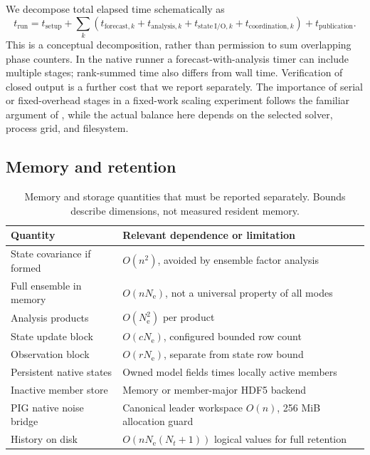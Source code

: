 \documentclass[11pt,a4paper]{article}
\newcommand{\Ne}{N_{\mathrm e}}
\begin{document}
We decompose total elapsed time schematically as
\begin{equation}
 t_{\mathrm{run}}=t_{\mathrm{setup}}+\sum_k
 \left(t_{\mathrm{forecast},k}+t_{\mathrm{analysis},k}
 +t_{\mathrm{state\ I/O},k}+t_{\mathrm{coordination},k}\right)
 +t_{\mathrm{publication}}.
 \label{eq:cost}
\end{equation}
This is a conceptual decomposition, rather than permission to sum overlapping phase counters. In the native runner a forecast-with-analysis timer can include multiple stages; rank-summed time also differs from wall time. Verification of closed output is a further cost that we report separately. The importance of serial or fixed-overhead stages in a fixed-work scaling experiment follows the familiar argument of \citet{amdahl1967}, while the actual balance here depends on the selected solver, process grid, and filesystem.

\subsection{Memory and retention}
\begin{table}[htbp]\centering\small
\caption{Memory and storage quantities that must be reported separately. Bounds describe dimensions, not measured resident memory.}\label{tab:memory}
\begin{tabular}{p{.35\linewidth}p{.54\linewidth}}\toprule
Quantity & Relevant dependence or limitation\\\midrule
State covariance if formed & \(O(n^2)\), avoided by ensemble factor analysis\\
Full ensemble in memory & \(O(n\Ne)\), not a universal property of all modes\\
Analysis products & \(O(\Ne^2)\) per product\\
State update block & \(O(c\Ne)\), configured bounded row count\\
Observation block & \(O(r\Ne)\), separate from state row bound\\
Persistent native states & Owned model fields times locally active members\\
Inactive member store & Memory or member-major HDF5 backend\\
PIG native noise bridge & Canonical leader workspace \(O(n)\), 256 MiB allocation guard\\
History on disk & \(O(n\Ne(N_t+1))\) logical values for full retention\\\bottomrule
\end{tabular}
\end{table}
\end{document}
